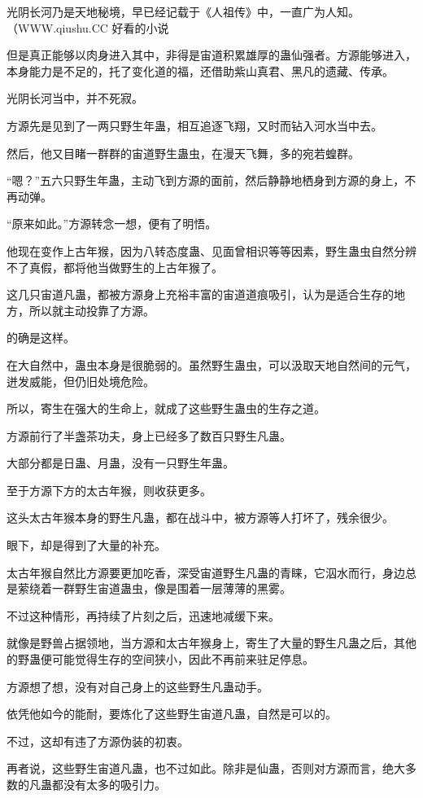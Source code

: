 \begin{this_body}
光阴长河乃是天地秘境，早已经记载于《人祖传》中，一直广为人知。（WWW.qiushu.CC 好看的小说

但是真正能够以肉身进入其中，非得是宙道积累雄厚的蛊仙强者。方源能够进入，本身能力是不足的，托了变化道的福，还借助紫山真君、黑凡的遗藏、传承。

光阴长河当中，并不死寂。

方源先是见到了一两只野生年蛊，相互追逐飞翔，又时而钻入河水当中去。

然后，他又目睹一群群的宙道野生蛊虫，在漫天飞舞，多的宛若蝗群。

“嗯？”五六只野生年蛊，主动飞到方源的面前，然后静静地栖身到方源的身上，不再动弹。

“原来如此。”方源转念一想，便有了明悟。

他现在变作上古年猴，因为八转态度蛊、见面曾相识等等因素，野生蛊虫自然分辨不了真假，都将他当做野生的上古年猴了。

这几只宙道凡蛊，都被方源身上充裕丰富的宙道道痕吸引，认为是适合生存的地方，所以就主动投靠了方源。

的确是这样。

在大自然中，蛊虫本身是很脆弱的。虽然野生蛊虫，可以汲取天地自然间的元气，迸发威能，但仍旧处境危险。

所以，寄生在强大的生命上，就成了这些野生蛊虫的生存之道。

方源前行了半盏茶功夫，身上已经多了数百只野生凡蛊。

大部分都是日蛊、月蛊，没有一只野生年蛊。

至于方源下方的太古年猴，则收获更多。

这头太古年猴本身的野生凡蛊，都在战斗中，被方源等人打坏了，残余很少。

眼下，却是得到了大量的补充。

太古年猴自然比方源要更加吃香，深受宙道野生凡蛊的青睐，它泅水而行，身边总是萦绕着一群野生宙道蛊虫，像是围着一层薄薄的黑雾。

不过这种情形，再持续了片刻之后，迅速地减缓下来。

就像是野兽占据领地，当方源和太古年猴身上，寄生了大量的野生凡蛊之后，其他的野蛊便可能觉得生存的空间狭小，因此不再前来驻足停息。

方源想了想，没有对自己身上的这些野生凡蛊动手。

依凭他如今的能耐，要炼化了这些野生宙道凡蛊，自然是可以的。

不过，这却有违了方源伪装的初衷。

再者说，这些野生宙道凡蛊，也不过如此。除非是仙蛊，否则对方源而言，绝大多数的凡蛊都没有太多的吸引力。


\end{this_body}
